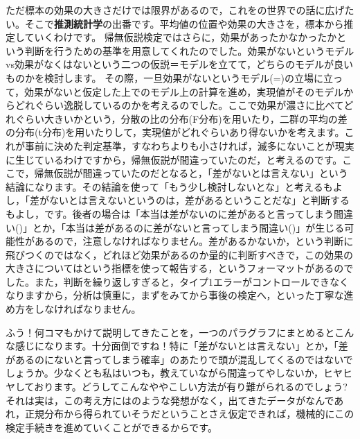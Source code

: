 \documentclass{ltjbook}
\begin{document}
ただ標本の効果の大きさだけでは限界があるので，これをの世界での話に広げたい。そこで\textbf{推測統計学}の出番です。平均値の位置や効果の大きさを，標本から推定していくわけです。
帰無仮説検定ではさらに，効果があったかなかったかという判断を行うための基準を用意してくれたのでした。効果がないというモデルvs効果がなくはないという二つの仮説＝モデルを立てて，どちらのモデルが良いものかを検討します。
その際，一旦効果がないというモデル(=)の立場に立って，効果がないと仮定した上でのモデル上の計算を進め，実現値がそのモデルからどれぐらい逸脱しているのかを考えるのでした。ここで効果が濃さに比べてどれぐらい大きいかという，分散の比の分布(F分布)を用いたり，二群の平均の差の分布(t分布)を用いたりして，実現値がどれぐらいあり得ないかを考えます。これが事前に決めた判定基準，すなわちよりも小さければ，滅多にないことが現実に生じているわけですから，帰無仮説が間違っていたのだ，と考えるのです。ここで，帰無仮説が間違っていたのだとなると，「差がないとは言えない」という結論になります。その結論を使って「もう少し検討しないとな」と考えるもよし，「差がないとは言えないというのは，差があるということだな」と判断するもよし，です。後者の場合は「本当は差がないのに差があると言ってしまう間違い()」とか，「本当は差があるのに差がないと言ってしまう間違い()」が生じる可能性があるので，注意しなければなりません。差があるかないか，という判断に飛びつくのではなく，どれほど効果があるのか量的に判断すべきで，この効果の大きさについてはという指標を使って報告する，というフォーマットがあるのでした。また，判断を繰り返しすぎると，タイプ1エラーがコントロールできなくなりますから，分析は慎重に，まずをみてから事後の検定へ，といった丁寧な進め方をしなければなりません。

ふう！何コマもかけて説明してきたことを，一つのパラグラフにまとめるとこんな感じになります。十分面倒ですね！特に「差がないとは言えない」とか，「差があるのにないと言ってしまう確率」のあたりで頭が混乱してくるのではないでしょうか。少なくとも私はいつも，教えていながら間違ってやしないか，ヒヤヒヤしております。どうしてこんなややこしい方法が有り難がられるのでしょう?それは実は，この考え方にはのような発想がなく，出てきたデータがなんであれ，正規分布から得られていそうだということさえ仮定できれば，機械的にこの検定手続きを進めていくことができるからです。
\end{document}

